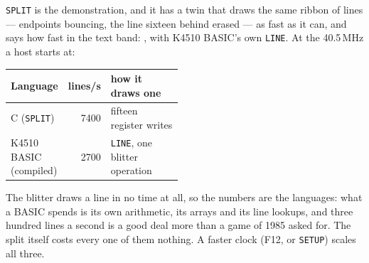 
\verb|SPLIT| is the demonstration, and it has a twin that draws the
same ribbon of lines --- endpoints bouncing, the line sixteen behind
erased --- as fast as it can, and says how fast in the text band:
, with K4510 BASIC's own
\verb|LINE|. At the 40.5\,MHz a host starts at:

\begin{center}
\small
\begin{tabular}{@{}l r >{\raggedright\arraybackslash}p{0.48\linewidth}@{}}
\toprule
\textbf{Language} & \textbf{lines/s} & \textbf{how it draws one} \\
\midrule
C (\verb|SPLIT|) & 7400 & fifteen register writes \\
K4510 BASIC (compiled) & 2700 & \verb|LINE|, one blitter operation \\

\bottomrule
\end{tabular}
\end{center}

\noindent The blitter draws a line in no time at all, so the numbers
are the languages: what a BASIC spends is its own arithmetic, its
arrays and its line lookups, and three hundred lines a second is a
good deal more than a game of 1985 asked for. The split itself costs
every one of them nothing. A faster clock (F12, or \verb|SETUP|) scales
all three.
